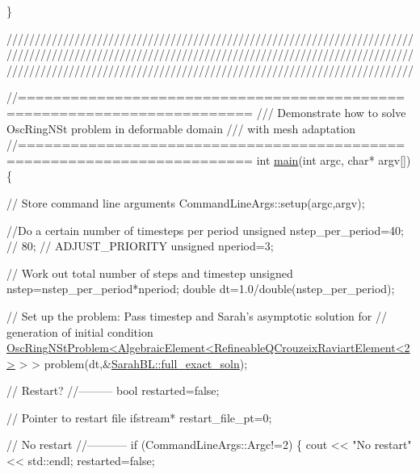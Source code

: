 \begin{DoxyCodeInclude}
{{{{{{{\}



\textcolor{comment}{}
\textcolor{comment}{////////////////////////////////////////////////////////////////////////}
\textcolor{comment}{////////////////////////////////////////////////////////////////////////}
\textcolor{comment}{////////////////////////////////////////////////////////////////////////}
\textcolor{comment}{}






\textcolor{comment}{//========================================================================}\textcolor{comment}{}
\textcolor{comment}{/// Demonstrate how to solve OscRingNSt problem in deformable domain}
\textcolor{comment}{/// with mesh adaptation}
\textcolor{comment}{}\textcolor{comment}{//========================================================================}
\textcolor{keywordtype}{int} \hyperlink{fsi__osc__ring_8cc_a0ddf1224851353fc92bfbff6f499fa97}{main}(\textcolor{keywordtype}{int} argc, \textcolor{keywordtype}{char}* argv[])
\{

 \textcolor{comment}{// Store command line arguments}
 CommandLineArgs::setup(argc,argv);

 \textcolor{comment}{//Do a certain number of timesteps per period}
 \textcolor{keywordtype}{unsigned} nstep\_per\_period=40; \textcolor{comment}{// 80;  // ADJUST\_PRIORITY}
 \textcolor{keywordtype}{unsigned} nperiod=3;

 \textcolor{comment}{// Work out total number of steps and timestep}
 \textcolor{keywordtype}{unsigned} nstep=nstep\_per\_period*nperiod;  
 \textcolor{keywordtype}{double} dt=1.0/double(nstep\_per\_period);

 \textcolor{comment}{// Set up the problem: Pass timestep and Sarah's asymptotic solution for}
 \textcolor{comment}{// generation of initial condition}
 \hyperlink{classOscRingNStProblem}{OscRingNStProblem<AlgebraicElement<RefineableQCrouzeixRaviartElement<2>}
       > >
  problem(dt,&\hyperlink{namespaceoomph_1_1SarahBL_a80c7c03073f6436ace00d2b2c5bfa501}{SarahBL::full\_exact\_soln});


 \textcolor{comment}{// Restart?}
 \textcolor{comment}{//---------}
 \textcolor{keywordtype}{bool} restarted=\textcolor{keyword}{false};

 \textcolor{comment}{// Pointer to restart file}
 ifstream* restart\_file\_pt=0;

 \textcolor{comment}{// No restart}
 \textcolor{comment}{//-----------}
 \textcolor{keywordflow}{if} (CommandLineArgs::Argc!=2)
  \{
   cout << \textcolor{stringliteral}{"No restart"} << std::endl;
   restarted=\textcolor{keyword}{false};

}}}}}}}
\end{DoxyCodeInclude}
